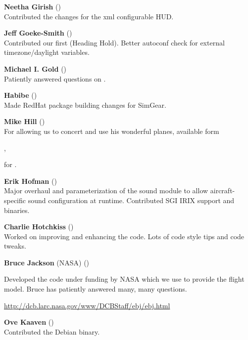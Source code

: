 \noindent \textbf{Neetha Girish}
()\\
  Contributed the changes for the xml configurable HUD.
 \medskip

\noindent \textbf{Jeff Goeke-Smith}
()\\
  Contributed our first  (Heading Hold).
  Better autoconf check for external timezone/daylight variables.
 \medskip

\noindent \textbf{Michael I. Gold}
()\\
 Patiently answered questions on .
 \medskip

\noindent \textbf{Habibe} ()\\
 Made RedHat package building changes for SimGear.
 \medskip

\noindent \textbf{Mike Hill} ()\\
 For allowing us to concert and use his wonderful planes, available form
 \medskip

 ,

 \noindent
 for \FlightGear{}.
 \medskip

\noindent \textbf{Erik Hofman} ()\\
  Major overhaul and parameterization of the sound module to allow
  aircraft-specific sound configuration at runtime.
  Contributed SGI IRIX support and binaries.
 \medskip

\noindent \textbf{Charlie Hotchkiss}
()\\ Worked on improving and enhancing the  code.
Lots of code style tips and code tweaks.
 \medskip

\noindent \textbf{Bruce Jackson} (NASA)
()
 \medskip

   Developed the  code under funding by NASA which we use to provide the
   flight model. Bruce has patiently answered many, many questions.
 \medskip

  \href{http://dcb.larc.nasa.gov/www/DCBStaff/ebj/ebj.html}{http://dcb.larc.nasa.gov/www/DCBStaff/ebj/ebj.html}
  \medskip


\noindent \textbf{Ove Kaaven}  ()\\
 Contributed the Debian binary.
 \medskip

